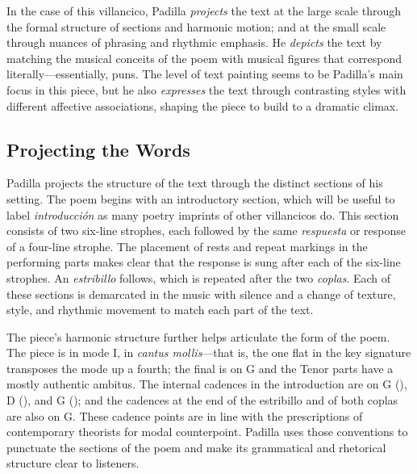 In the case of this villancico, Padilla \emph{projects} the text at the large
scale through the formal structure of sections and harmonic motion; and at the
small scale through nuances of phrasing and rhythmic emphasis.
He \emph{depicts} the text by matching the musical conceits of the poem with
musical figures that correspond literally---essentially, puns.
The level of text painting seems to be Padilla's main focus in this piece, but
he also \emph{expresses} the text through contrasting styles with different
affective associations, shaping the piece to build to a dramatic climax.

\subsection{Projecting the Words}

Padilla projects the structure of the text through the distinct sections of his
setting.
The poem begins with an introductory section, which will be useful to label
\emph{introducción} as many poetry imprints of other villancicos do.
This section consists of two six-line strophes, each followed by the same
\emph{respuesta} or response of a four-line strophe.
The placement of rests and repeat markings in the performing parts makes clear
that the response is sung after each of the six-line strophes.
An \emph{estribillo} follows, which is repeated after the two \emph{coplas}.
Each of these sections is demarcated in the music with silence and a change of
texture, style, and rhythmic movement to match each part of the text.

The piece's harmonic structure further helps articulate the form of the poem.
The piece is in mode I, in \emph{cantus mollis}---that is, the one flat in the
key signature transposes the mode up a fourth; the final is on G and the Tenor
parts have a mostly authentic ambitus.
The internal cadences in the introduction are on G (), D
(), and G (); and the cadences at the end of the
estribillo and of both coplas are also on G.
These cadence points are in line with the prescriptions of contemporary
theorists for modal counterpoint.%
    \Autocites
    [873--882, 883--885, 907--912]{Cerone:Melopeo}
    [364--406]{Judd:RenaissanceModalTheory}
    {Barnett:TonalOrganization17C}
Padilla uses those conventions to punctuate the sections of the poem and make
its grammatical and rhetorical structure clear to listeners.

